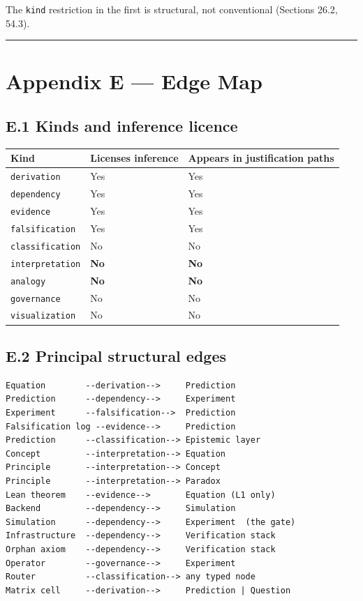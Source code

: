 \documentclass[
  11pt]{report}
\begin{document}
The \texttt{kind} restriction in the first is structural, not
conventional (Sections 26.2, 54.3).

\begin{center}\rule{0.5\linewidth}{0.5pt}\end{center}

\hypertarget{appendix-e-edge-map}{%
\chapter{Appendix E --- Edge Map}\label{appendix-e-edge-map}}

\hypertarget{e.1-kinds-and-inference-licence}{%
\section{E.1 Kinds and inference
licence}\label{e.1-kinds-and-inference-licence}}

\begin{longtable}[]{@{}lll@{}}
\toprule\noalign{}
Kind & Licenses inference & Appears in justification paths \\
\midrule\noalign{}
\endhead
\bottomrule\noalign{}
\endlastfoot
\texttt{derivation} & Yes & Yes \\
\texttt{dependency} & Yes & Yes \\
\texttt{evidence} & Yes & Yes \\
\texttt{falsification} & Yes & Yes \\
\texttt{classification} & No & No \\
\texttt{interpretation} & \textbf{No} & \textbf{No} \\
\texttt{analogy} & \textbf{No} & \textbf{No} \\
\texttt{governance} & No & No \\
\texttt{visualization} & No & No \\
\end{longtable}

\hypertarget{e.2-principal-structural-edges}{%
\section{E.2 Principal structural
edges}\label{e.2-principal-structural-edges}}

\begin{verbatim}
Equation        --derivation-->     Prediction
Prediction      --dependency-->     Experiment
Experiment      --falsification-->  Prediction
Falsification log --evidence-->     Prediction
Prediction      --classification--> Epistemic layer
Concept         --interpretation--> Equation
Principle       --interpretation--> Concept
Principle       --interpretation--> Paradox
Lean theorem    --evidence-->       Equation (L1 only)
Backend         --dependency-->     Simulation
Simulation      --dependency-->     Experiment  (the gate)
Infrastructure  --dependency-->     Verification stack
Orphan axiom    --dependency-->     Verification stack
Operator        --governance-->     Experiment
Router          --classification--> any typed node
Matrix cell     --derivation-->     Prediction | Question
\end{verbatim}
\end{document}
